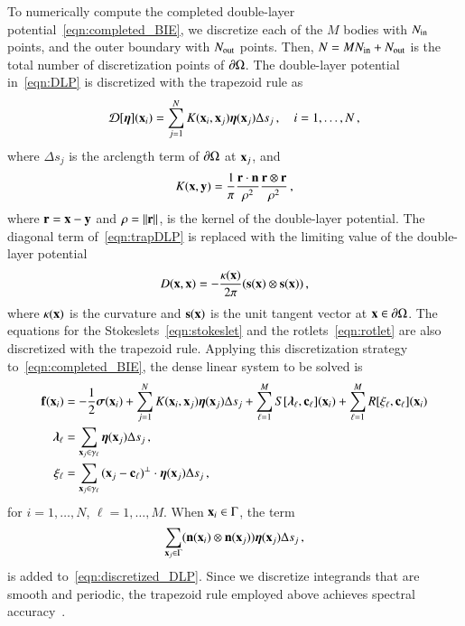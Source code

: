 \documentclass[preprint, 10pt]{elsarticle}
\begin{document}
To numerically compute the completed double-layer potential~\eqref{eqn:completed_BIE}, we discretize each of the $M$ bodies with  $N_{\mathrm{in}}$ points, and the outer boundary with $N_{\mathrm{out}}$ points.  Then, $N = MN_{\mathrm{in}} + N_{\mathrm{out}}$ is the total number of discretization points of ${\partial}\Omega$.  The double-layer potential in~\eqref{eqn:DLP} is discretized with the trapezoid rule as
\begin{align}
  {\mathcal{D}}[{\boldsymbol\eta}]({\mathbf{x}}_i) = \sum_{j=1}^{N} K({\mathbf{x}}_i,{\mathbf{x}}_j) {\boldsymbol\eta}({\mathbf{x}}_j) 
      \Delta s_{j}\, , \quad i=1,\ldots,N \, ,
  \label{eqn:trapDLP}
\end{align}
where $\Delta s_j$ is the arclength term of ${\partial}\Omega$ at
${\mathbf{x}}_j$, and
\begin{align}
  K({\mathbf{x}},{\mathbf{y}}) = \frac{1}{\pi} \frac{{\mathbf{r}} \cdot {\mathbf{n}}}{\rho^2} 
      \frac{{\mathbf{r}} \otimes {\mathbf{r}}}{\rho^2} \, ,
\end{align}
where ${\mathbf{r}} = {\mathbf{x}} - {\mathbf{y}}$ and $\rho = \|{\mathbf{r}}\|$, is the kernel of the double-layer potential.  The diagonal term of~\eqref{eqn:trapDLP} is replaced with the limiting value of the double-layer potential
\begin{align}
  D({\mathbf{x}},{\mathbf{x}}) = -\frac{\kappa({\mathbf{x}})}{2\pi}({\mathbf{s}}({\mathbf{x}}) \otimes {\mathbf{s}}({\mathbf{x}})) \, ,
\end{align}
where $\kappa({\mathbf{x}})$ is the curvature and ${\mathbf{s}}({\mathbf{x}})$ is the unit tangent vector at ${\mathbf{x}} \in {\partial}\Omega$.  The equations for the Stokeslets~\eqref{eqn:stokeslet} and the rotlets~\eqref{eqn:rotlet} are also discretized with the trapezoid rule.  Applying this discretization strategy to~\eqref{eqn:completed_BIE}, the dense linear system to be solved is
\begin{subequations}
  \label{eqn:completed_BIE_discretized}
  \begin{align}
  \label{eqn:discretized_DLP}
    {\mathbf{f}}({\mathbf{x}}_i) &= -\frac{1}{2}{\boldsymbol\sigma}({\mathbf{x}}_i) + \sum_{j=1}^{N} 
      K({\mathbf{x}}_i,{\mathbf{x}}_j) {\boldsymbol\eta}({\mathbf{x}}_j) \Delta s_{j} + 
      \sum_{\ell=1}^M S[{\boldsymbol\lambda}_\ell,{\mathbf{c}}_\ell]({\mathbf{x}}_i) +
      \sum_{\ell=1}^M R[\xi_\ell,{\mathbf{c}}_\ell]({\mathbf{x}}_i) \\
    {\boldsymbol\lambda}_\ell &= \sum_{{\mathbf{x}}_j \in \gamma_\ell} {\boldsymbol\eta}({\mathbf{x}}_j) 
      \Delta s_j \, , \\ 
    \xi_\ell &= \sum_{{\mathbf{x}}_j \in \gamma_\ell}
      {({\mathbf{x}}_j - {\mathbf{c}}_\ell)}^\perp \cdot {\boldsymbol\eta}({\mathbf{x}}_j) \Delta s_j \, ,
  \end{align}
\end{subequations}
for $i=1,\ldots,N$, $\ell=1,\ldots,M$.  When ${\mathbf{x}}_i \in \Gamma$, the term 
\begin{align}
  \sum_{{\mathbf{x}}_j \in \Gamma} ({\mathbf{n}}({\mathbf{x}}_i) \otimes
      {\mathbf{n}}({\mathbf{x}}_j)){\boldsymbol\eta}({\mathbf{x}}_j) \Delta s_j \, ,
\end{align}
is added to~\eqref{eqn:discretized_DLP}.  Since we discretize integrands that are smooth and periodic, the trapezoid rule employed above achieves spectral accuracy~\cite{tre-wei2014}.  
\end{document}
